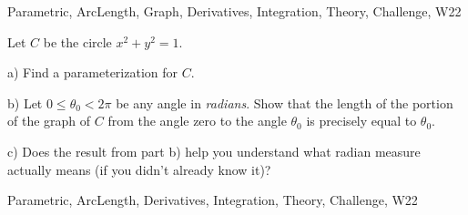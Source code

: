 \begin{tagblock}{Parametric, ArcLength, Graph, Derivatives, Integration, Theory, Challenge, W22}
\begin{question}

Let $C$ be the circle $x^2+y^2=1$.  

\bigskip

a) Find a parameterization for $C$. 

\bigskip

b) Let $0\leq \theta_0<2\pi$ be any angle in \textit{radians}. Show that the length of the portion of the graph of $C$ from the angle zero to the angle $\theta_0$ is precisely equal to $\theta_0$. 

\bigskip

c) Does the result from part b) help you understand what radian measure actually means (if you didn't already know it)?
	
	
\begin{tags}
	    Parametric, ArcLength, Derivatives, Integration, Theory, Challenge, W22
\end{tags}
	
\begin{diary}
\end{diary}
	
\begin{solution}
	   
\end{solution}
	
\end{question}

\end{tagblock}

